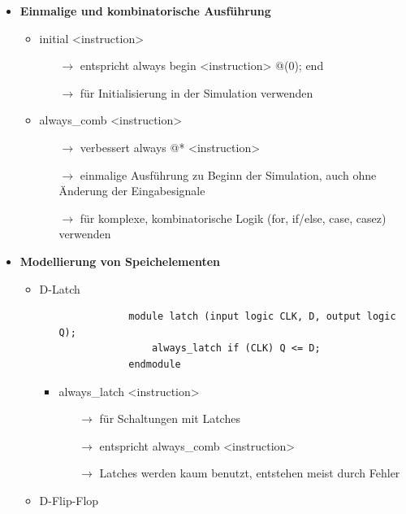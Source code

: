 \documentclass[11pt,a4paper]{article}
\begin{document}
\begin{itemize}
\item \textbf{Einmalige und kombinatorische Ausführung}
	\begin{itemize}
	\item initial <instruction>
		\begin{itemize}
		\item[$\rightarrow$] entspricht always begin <instruction> @(0); end
		\item[$\rightarrow$] für Initialisierung in der Simulation verwenden
		\end{itemize}
	\item always\_comb <instruction> 
		\begin{itemize}
		\item[$\rightarrow$] verbessert always @* <instruction>
 		\item[$\rightarrow$] einmalige Ausführung zu Beginn der Simulation, auch ohne Änderung der Eingabesignale
 		\item[$\rightarrow$] für komplexe, kombinatorische Logik (for, if/else, case, casez) verwenden
		\end{itemize}
	\end{itemize}

\pagebreak

\item \textbf{Modellierung von Speichelementen}
	\begin{itemize}
	
	\item D-Latch
		\begin{itemize}
		\item[]
			\begin{lstlisting}
			module latch (input logic CLK, D, output logic Q);
				always_latch if (CLK) Q <= D;
			endmodule			
			\end{lstlisting}
		\item always\_latch <instruction>
			\begin{itemize}
			\item[$\rightarrow$] für Schaltungen mit Latches
			\item[$\rightarrow$] entspricht always\_comb <instruction>
			\item[$\rightarrow$] Latches werden kaum benutzt, entstehen meist durch Fehler
			\end{itemize}
		\end{itemize}
	
	\item D-Flip-Flop
		\begin{itemize}
		

\end{itemize}
\end{itemize}
\end{itemize}
\end{document}
